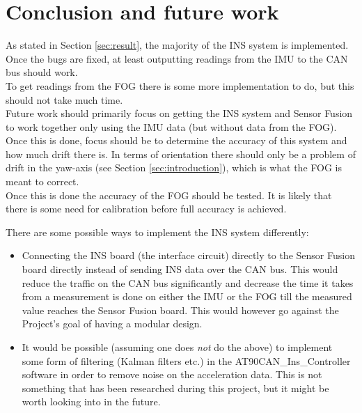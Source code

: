 
\section{Conclusion and future work}\label{sec:conclusion}
As stated in Section \ref{sec:result}, the majority of the INS system is implemented. Once the bugs are fixed, at least outputting readings from the IMU to the CAN bus should work. \\
To get readings from the FOG there is some more implementation to do, but this should not take much time. \\ %
Future work should primarily focus on getting the INS system and Sensor Fusion to work together only using the IMU data (but without data from the FOG). Once this is done, focus should be to determine the accuracy of this system and how much drift there is. In terms of orientation there should only be a problem of drift in the yaw-axis (see Section \ref{sec:introduction}), which is what the FOG is meant to correct. \\
Once this is done the accuracy of the FOG should be tested. It is likely that there is some need for calibration before full accuracy is achieved.
\pagebreak

There are some possible ways to implement the INS system differently:

\begin{itemize}
\item Connecting the INS board (the interface circuit) directly to the Sensor Fusion board directly instead of sending INS data over the CAN bus. This would reduce the traffic on the CAN bus significantly and decrease the time it takes from a measurement is done on either the IMU or the FOG till the measured value reaches the Sensor Fusion board. This would however go against the Project's goal of having a modular design.

\item It would be possible (assuming one does \emph{not} do the above) to implement some form of filtering (Kalman filters etc.) in the AT90CAN\_Ins\_Controller software in order to remove noise on the acceleration data. This is not something that has been researched during this project, but it might be worth looking into in the future.

\end{itemize}



